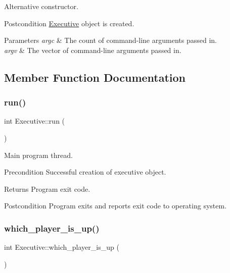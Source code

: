 Alternative constructor. 

\begin{DoxyPostcond}{Postcondition}
\mbox{\hyperlink{classExecutive}{Executive}} object is created. 
\end{DoxyPostcond}

\begin{DoxyParams}{Parameters}
{\em argc} & The count of command-\/line arguments passed in. \\
\hline
{\em argv} & The vector of command-\/line arguments passed in. \\
\hline
\end{DoxyParams}


\subsection{Member Function Documentation}
\mbox{\label{classExecutive_ae73fbe9374b4f5362fa224dc18e601a7}} 
\subsubsection{\texorpdfstring{run()}{run()}}
{\footnotesize\ttfamily int Executive\+::run (\begin{DoxyParamCaption}{ }\end{DoxyParamCaption})}



Main program thread. 

\begin{DoxyPrecond}{Precondition}
Successful creation of executive object. 
\end{DoxyPrecond}
\begin{DoxyReturn}{Returns}
Program exit code. 
\end{DoxyReturn}
\begin{DoxyPostcond}{Postcondition}
Program exits and reports exit code to operating system. 
\end{DoxyPostcond}
\mbox{\label{classExecutive_af910b08a89311aeb591440a58a6338f0}} 
\subsubsection{\texorpdfstring{which\_player\_is\_up()}{which\_player\_is\_up()}}
{\footnotesize\ttfamily int Executive\+::which\+\_\+player\+\_\+is\+\_\+up (\begin{DoxyParamCaption}{ }\end{DoxyParamCaption})}



